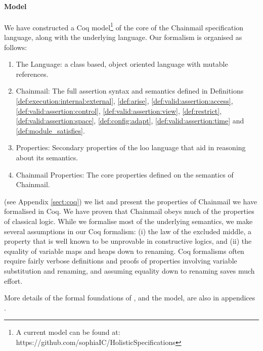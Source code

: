   





\paragraph{Model}

We have constructed a Coq model\footnote{A current model can be found at: https://github.com/sophiaIC/HolisticSpecifications} \cite{coq} of the core of the Chainmail
specification language, along with the underlying \LangOO language.
Our formalism is organised as follows:
\begin{enumerate}
\item
The \LangOO Language: a class based, object oriented language with mutable references.
\item
Chainmail: The full assertion syntax and semantics defined in Definitions \ref{def:execution:internal:external}, \ref{def:arise}, \ref{def:valid:assertion:access}, \ref{def:valid:assertion:control}, \ref{def:valid:assertion:view}, \ref{def:restrict}, \ref{def:valid:assertion:space}, \ref{def:config:adapt}, \ref{def:valid:assertion:time} and \ref{def:module_satisfies}.
\item
\LangOO Properties: Secondary properties of the loo language that aid in reasoning about its semantics.
\item
Chainmail Properties: The core properties defined on the semantics of Chainmail.
\end{enumerate}

 (see Appendix \ref{sect:coq}) we list and present the properties of Chainmail we have formalised in Coq.
We have proven that Chainmail obeys much of the properties of classical logic. While we formalise most of the underlying semantics, we make several assumptions in our Coq formalism: (i) the law of the excluded middle,  a property that is well known to be unprovable in constructive logics, and (ii) the equality of variable maps and heaps down to renaming. Coq formalisms often require fairly verbose definitions and proofs of properties involving variable substitution and renaming, and assuming equality down to renaming saves much effort.

More details of the formal foundations of \Chainmail, and the model,
are also in appendices \cite{examples}.

